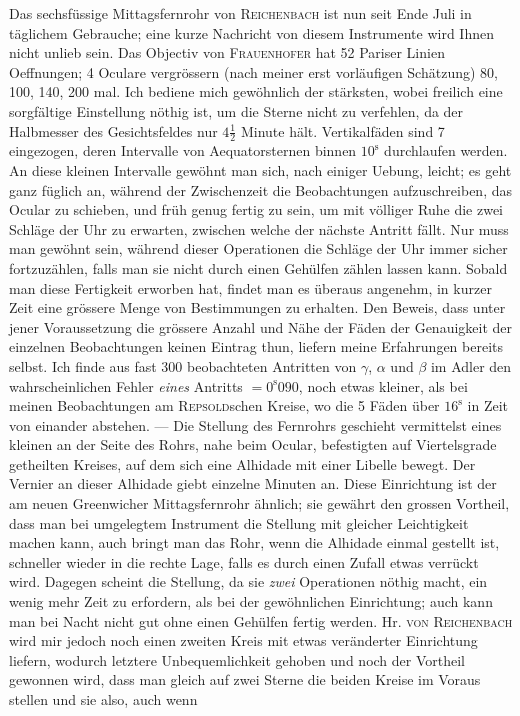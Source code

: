 \par\indent Das sechsfüssige Mittagsfernrohr von \textsc{Reichenbach} ist nun seit Ende Juli in täglichem Gebrauche; eine kurze Nachricht von diesem Instrumente wird Ihnen nicht unlieb sein. Das Objectiv von \textsc{Frauenhofer}
 hat 52 Pariser Linien Oeffnungen; 4 Oculare vergrössern (nach meiner erst vorläufigen Schätzung) 80, 100, 140, 200 mal. Ich bediene mich gewöhnlich der stärksten, wobei freilich eine sorgfältige Einstellung nöthig ist, um die Sterne nicht zu verfehlen, da der Halbmesser des Gesichtsfeldes nur $4\tfrac{1}{2}$ Minute hält. Vertikalfäden sind 7 eingezogen, deren Intervalle von Aequatorsternen binnen $10^{\mathrm s}$ durchlaufen werden. An diese kleinen Intervalle gewöhnt man sich, nach einiger Uebung, leicht; es geht ganz füglich an, während der Zwischenzeit die Beobachtungen aufzuschreiben, das Ocular zu schieben, 
und früh genug fertig zu sein, um mit völliger Ruhe die zwei Schläge der Uhr zu erwarten, zwischen
welche der nächste Antritt fällt. Nur muss man gewöhnt sein, während dieser Operationen die Schläge
der Uhr immer sicher fortzuzählen, falls man sie nicht durch einen Gehülfen zählen lassen kann. Sobald
man diese Fertigkeit erworben hat, findet man es überaus angenehm, in kurzer Zeit eine grössere
Menge von Bestimmungen zu erhalten. Den Beweis, dass unter jener Voraussetzung die grössere Anzahl und Nähe der Fäden der Genauigkeit der einzelnen Beobachtungen keinen Eintrag thun, liefern
meine Erfahrungen bereits selbst. Ich finde aus fast 300 beobachteten Antritten von $\gamma$, $\alpha$ und $\beta$ im
Adler den wahrscheinlichen Fehler \emph{eines} Antritts $= 0^{\mathrm{s}}090$, noch etwas kleiner, als bei meinen Beobachtungen am \textsc{Repsold}schen Kreise, wo die 5 Fäden über $16^{\mathrm{s}}$ in Zeit von einander abstehen. — Die Stellung des Fernrohrs geschieht vermittelst eines kleinen an der Seite des Rohrs, nahe beim Ocular, befestigten auf Viertelsgrade getheilten Kreises, auf dem sich eine Alhidade mit einer Libelle bewegt.
Der Vernier an dieser Alhidade giebt einzelne Minuten an. Diese Einrichtung ist der am neuen Greenwicher Mittagsfernrohr ähnlich; sie gewährt den grossen Vortheil, dass man bei umgelegtem Instrument die Stellung mit gleicher Leichtigkeit machen kann, auch bringt man das Rohr, wenn die Alhidade einmal gestellt ist, schneller wieder in die rechte Lage, falls es durch einen Zufall etwas verrückt
wird. Dagegen scheint die Stellung, da sie \emph{zwei} Operationen nöthig macht, ein wenig mehr Zeit zu
erfordern, als bei der gewöhnlichen Einrichtung; auch kann man bei Nacht nicht gut ohne einen Gehülfen fertig werden. Hr. \textsc{von Reichenbach} wird mir jedoch noch einen zweiten Kreis mit etwas veränderter Einrichtung liefern, wodurch letztere Unbequemlichkeit gehoben und noch der Vortheil gewonnen wird, dass man gleich auf zwei Sterne die beiden Kreise im Voraus stellen und sie also, auch wenn
